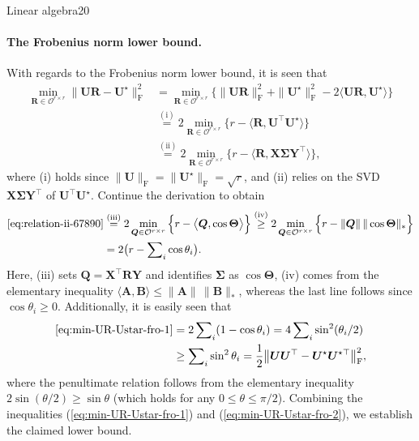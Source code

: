 \documentclass{article}
\begin{document}
\begin{problem}{Linear algebra}{20}
{\paragraph{The Frobenius norm lower bound.}

With regards to the Frobenius norm lower bound, it is seen that
%
\begin{align}
\min_{\bm{R}\in\mathcal{O}^{r\times r}}\big\|\bm{U}\bm{R}-\bm{U}^{\star}\big\|_{\mathrm{F}}^{2} & =\min_{\bm{R}\in\mathcal{O}^{r\times r}}\Big\{\|\bm{U}\bm{R}\|_{\mathrm{F}}^{2}+\|\bm{U}^{\star}\|_{\mathrm{F}}^{2}-2\big\langle\bm{U}\bm{R},\bm{U}^{\star}\big\rangle\Big\}\nonumber \\
 & \overset{(\mathrm{i})}{=} 2\min_{\bm{R}\in\mathcal{O}^{r\times r}}\Big\{ r-\big\langle\bm{R},\bm{U}^{\top}\bm{U}^{\star}\big\rangle\Big\}\nonumber \\
 & \overset{(\mathrm{ii})}{=} 2\min_{\bm{R}\in\mathcal{O}^{r\times r}}\Big\{ r-\big\langle\bm{R},\bm{X}\bm{\Sigma}\bm{Y}^{\top}\big\rangle\Big\} ,
	\label{eq:relation-ii-67890}
\end{align}
%
where (i) holds since $\|\bm{U}\|_{\mathrm{F}}=\|\bm{U}^{\star}\|_{\mathrm{F}}=\sqrt{r}$,
and (ii) relies on the SVD $\bm{X}\bm{\Sigma}\bm{Y}^{\top}$ of $\bm{U}^{\top}\bm{U}^{\star}$.
Continue the derivation to obtain
%
\begin{align}
\eqref{eq:relation-ii-67890}
	& \overset{(\mathrm{iii})}{=}  2\min_{\bm{Q}\in\mathcal{O}^{r\times r}}\Big\{ r-\big\langle\bm{Q},\cos\bm{\Theta}\big\rangle\Big\}
	 \overset{(\mathrm{iv})}{\geq} 2\min_{\bm{Q}\in\mathcal{O}^{r\times r}}\Big\{ r-\|\bm{Q}\|\,\|\cos\bm{\Theta}\|_{*}\Big\}\nonumber \\
 & =2 \big( r-\sum\nolimits_{i}\cos\theta_{i}\big).\label{eq:min-UR-Ustar-fro-1}
\end{align}
%
Here, (iii) sets $\bm{Q}=\bm{X}^{\top}\bm{R}\bm{Y}$ and identifies
$\bm{\Sigma}$ as $\cos\bm{\Theta}$,
(iv) comes from the elementary inequality $\langle \bm{A}, \bm{B} \rangle \leq \|\bm{A}\|\,\|\bm{B}\|_*$,
whereas the last line follows
since $\cos\theta_{i}\geq0$. Additionally, it is easily seen that
%
\begin{align}
\eqref{eq:min-UR-Ustar-fro-1}
	& =2\sum\nolimits_{i} (1-\cos\theta_{i})=4\sum\nolimits_{i} \sin^{2}(\theta_{i}/2)\nonumber \\
 & \geq \sum\nolimits_{i} \sin^{2}\theta_{i}
  =\frac{1}{2} \big\Vert \bm{U}\bm{U}^{\top}-{\bm{U}}^{\star}{\bm{U}}^{\star\top}\big\Vert _{\mathrm{F}}^2 ,
	\label{eq:min-UR-Ustar-fro-2}
\end{align}
%
where the penultimate relation follows from the elementary inequality
$2\sin(\theta/2)\geq\sin\theta$ (which holds for any $0\leq\theta\leq\pi/2$).
Combining the inequalities (\ref{eq:min-UR-Ustar-fro-1}) and (\ref{eq:min-UR-Ustar-fro-2}),
we establish the claimed lower bound.




}


\end{problem}
\end{document}
